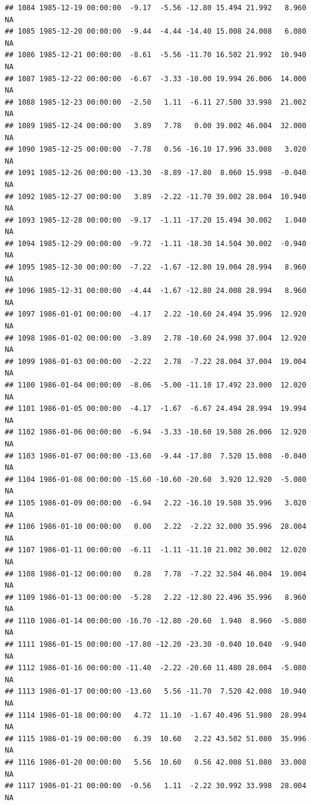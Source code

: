 \documentclass{article}\usepackage{graphicx, color}
\makeatletter
\newenvironment{kframe}{%
 \def\at@end@of@kframe{}%
 \ifinner\ifhmode%
  \def\at@end@of@kframe{\end{minipage}}%
  \begin{minipage}{\columnwidth}%
 \fi\fi%
 \def\FrameCommand##1{\hskip\@totalleftmargin \hskip-\fboxsep
 \colorbox{shadecolor}{##1}\hskip-\fboxsep
     \hskip-\linewidth \hskip-\@totalleftmargin \hskip\columnwidth}%
 \MakeFramed {\advance\hsize-\width
   \@totalleftmargin\z@ \linewidth\hsize
   \@setminipage}}%
 {\par\unskip\endMakeFramed%
 \at@end@of@kframe}
\newenvironment{knitrout}{}{} %
\makeatother
\begin{document}
\begin{knitrout}
\begin{kframe}
\begin{verbatim}
## 1084 1985-12-19 00:00:00  -9.17  -5.56 -12.80 15.494 21.992   8.960     NA
## 1085 1985-12-20 00:00:00  -9.44  -4.44 -14.40 15.008 24.008   6.080     NA
## 1086 1985-12-21 00:00:00  -8.61  -5.56 -11.70 16.502 21.992  10.940     NA
## 1087 1985-12-22 00:00:00  -6.67  -3.33 -10.00 19.994 26.006  14.000     NA
## 1088 1985-12-23 00:00:00  -2.50   1.11  -6.11 27.500 33.998  21.002     NA
## 1089 1985-12-24 00:00:00   3.89   7.78   0.00 39.002 46.004  32.000     NA
## 1090 1985-12-25 00:00:00  -7.78   0.56 -16.10 17.996 33.008   3.020     NA
## 1091 1985-12-26 00:00:00 -13.30  -8.89 -17.80  8.060 15.998  -0.040     NA
## 1092 1985-12-27 00:00:00   3.89  -2.22 -11.70 39.002 28.004  10.940     NA
## 1093 1985-12-28 00:00:00  -9.17  -1.11 -17.20 15.494 30.002   1.040     NA
## 1094 1985-12-29 00:00:00  -9.72  -1.11 -18.30 14.504 30.002  -0.940     NA
## 1095 1985-12-30 00:00:00  -7.22  -1.67 -12.80 19.004 28.994   8.960     NA
## 1096 1985-12-31 00:00:00  -4.44  -1.67 -12.80 24.008 28.994   8.960     NA
## 1097 1986-01-01 00:00:00  -4.17   2.22 -10.60 24.494 35.996  12.920     NA
## 1098 1986-01-02 00:00:00  -3.89   2.78 -10.60 24.998 37.004  12.920     NA
## 1099 1986-01-03 00:00:00  -2.22   2.78  -7.22 28.004 37.004  19.004     NA
## 1100 1986-01-04 00:00:00  -8.06  -5.00 -11.10 17.492 23.000  12.020     NA
## 1101 1986-01-05 00:00:00  -4.17  -1.67  -6.67 24.494 28.994  19.994     NA
## 1102 1986-01-06 00:00:00  -6.94  -3.33 -10.60 19.508 26.006  12.920     NA
## 1103 1986-01-07 00:00:00 -13.60  -9.44 -17.80  7.520 15.008  -0.040     NA
## 1104 1986-01-08 00:00:00 -15.60 -10.60 -20.60  3.920 12.920  -5.080     NA
## 1105 1986-01-09 00:00:00  -6.94   2.22 -16.10 19.508 35.996   3.020     NA
## 1106 1986-01-10 00:00:00   0.00   2.22  -2.22 32.000 35.996  28.004     NA
## 1107 1986-01-11 00:00:00  -6.11  -1.11 -11.10 21.002 30.002  12.020     NA
## 1108 1986-01-12 00:00:00   0.28   7.78  -7.22 32.504 46.004  19.004     NA
## 1109 1986-01-13 00:00:00  -5.28   2.22 -12.80 22.496 35.996   8.960     NA
## 1110 1986-01-14 00:00:00 -16.70 -12.80 -20.60  1.940  8.960  -5.080     NA
## 1111 1986-01-15 00:00:00 -17.80 -12.20 -23.30 -0.040 10.040  -9.940     NA
## 1112 1986-01-16 00:00:00 -11.40  -2.22 -20.60 11.480 28.004  -5.080     NA
## 1113 1986-01-17 00:00:00 -13.60   5.56 -11.70  7.520 42.008  10.940     NA
## 1114 1986-01-18 00:00:00   4.72  11.10  -1.67 40.496 51.980  28.994     NA
## 1115 1986-01-19 00:00:00   6.39  10.60   2.22 43.502 51.080  35.996     NA
## 1116 1986-01-20 00:00:00   5.56  10.60   0.56 42.008 51.080  33.008     NA
## 1117 1986-01-21 00:00:00  -0.56   1.11  -2.22 30.992 33.998  28.004     NA

\end{verbatim}
\end{kframe}
\end{knitrout}
\end{document}
